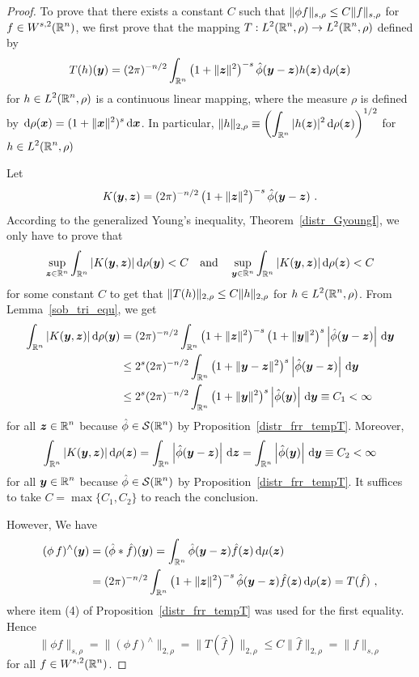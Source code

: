 \begin{proof}
To prove that there exists a constant $C$ such that
$\displaystyle \|\phi f \|_{s,\rho} \leq C \|f\|_{s,\rho}$ for
$\displaystyle f \in W^{s,2}(\mathbb{R}^n)$, we first prove that the mapping 
$\displaystyle T : L^2(\mathbb{R}^n,\rho) \rightarrow L^2(\mathbb{R}^n,\rho)$
defined by
\[
T(h)({\bm{y}}) =
(2\pi)^{-n/2} \int_{\mathbb{R}^n} \left(1+\|{\bm{z}}\|^2\right)^{-s}
\hat{\phi}({\bm{y}} - {\bm{z}}) h({\bm{z}}) \,\mathrm{d}{\rho({\bm{z}})}
\]
for $\displaystyle h \in L^2(\mathbb{R}^n,\rho)$ is a continuous linear
mapping, where the measure $\rho$ is defined by
$\displaystyle \,\mathrm{d}{\rho({\bm{x}})} = (1+\|{\bm{x}}\|^2)^s\,\mathrm{d}{{\bm{x}}}$.
In particular,
$\displaystyle \|h\|_{2,\rho} \equiv \left(
\int_{\mathbb{R}^n} |h({\bm{z}})|^2 \,\mathrm{d}{\rho({\bm{z}})}\right)^{1/2}$ for
$\displaystyle h \in L^2(\mathbb{R}^n,\rho)$

Let
\[
K({\bm{y}},{\bm{z}}) =(2\pi)^{-n/2} \left(1+\|{\bm{z}}\|^2\right)^{-s}
\hat{\phi}({\bm{y}} - {\bm{z}}) \ .
\]
According to the generalized Young's inequality,
Theorem~\ref{distr_GyoungI}, we only have to prove that
\[
\sup_{{\bm{z}}\in\mathbb{R}^n}
\int_{\mathbb{R}^n} |K({\bm{y}},{\bm{z}})|\,\mathrm{d}{\rho({\bm{y}})} < C \quad
\text{and} \quad
\sup_{{\bm{y}}\in\mathbb{R}^n}
\int_{\mathbb{R}^n} |K({\bm{y}},{\bm{z}})|\,\mathrm{d}{\rho({\bm{z}})} < C
\]
for some constant $C$ to get that
$\displaystyle \|T(h) \|_{2,\rho} \leq C \|h\|_{2,\rho}$ for
$\displaystyle h \in L^2(\mathbb{R}^n,\rho)$.  From
Lemma~\ref{sob_tri_equ}, we get
\begin{align*}
\int_{\mathbb{R}^n}|K({\bm{y}},{\bm{z}})| \,\mathrm{d}{\rho({\bm{y}})}
&= (2\pi)^{-n/2} \int_{\mathbb{R}^n} \left(1+\|{\bm{z}}\|^2\right)^{-s}
\left(1+\|{\bm{y}}\|^2\right)^{s}
\left|\hat{\phi}({\bm{y}} - {\bm{z}})\right|\,\mathrm{d}{{\bm{y}}} \\
&\leq 2^s (2\pi)^{-n/2} \int_{\mathbb{R}^n} \left(1+\|{\bm{y}}-{\bm{z}}\|^2\right)^{s}
\left|\hat{\phi}({\bm{y}} - {\bm{z}})\right|\,\mathrm{d}{{\bm{y}}} \\
&\leq 2^s (2\pi)^{-n/2} \int_{\mathbb{R}^n} \left(1+\|{\bm{y}}\|^2\right)^{s}
\left|\hat{\phi}({\bm{y}})\right|\,\mathrm{d}{{\bm{y}}} \equiv C_1 < \infty
\end{align*}
for all $\displaystyle {\bm{z}}\in \mathbb{R}^n$ because
$\displaystyle \hat{\phi} \in \mathcal{S}(\mathbb{R}^n)$ by
Proposition~\ref{distr_frr_tempT}.
Moreover,
\[
\int_{\mathbb{R}^n} |K({\bm{y}}, {\bm{z}})| \,\mathrm{d}{\rho({\bm{z}})}
= \int_{\mathbb{R}^n} \left|\hat{\phi}({\bm{y}} - {\bm{z}})\right|\,\mathrm{d}{{\bm{z}}}
= \int_{\mathbb{R}^n} \left|\hat{\phi}({\bm{y}})\right|\,\mathrm{d}{{\bm{y}}} \equiv C_2
< \infty
\]
for all $\displaystyle {\bm{y}}\in \mathbb{R}^n$ because
$\displaystyle \hat{\phi} \in \mathcal{S}(\mathbb{R}^n)$ by
Proposition~\ref{distr_frr_tempT}.  It suffices to take
$C = \max\{C_1,C_2\}$ to reach the conclusion.

However, We have
\begin{align*}
(\phi\,f)^\wedge({\bm{y}}) &= (\hat{\phi}\ast \hat{f})({\bm{y}})
= \int_{\mathbb{R}^n} \hat{\phi}({\bm{y}} - {\bm{z}}) \hat{f}({\bm{z}})
\,\mathrm{d}{\mu({\bm{z}})} \\
&= (2\pi)^{-n/2} \int_{\mathbb{R}^n} \left(1+\|{\bm{z}}\|^2\right)^{-s}
\hat{\phi}({\bm{y}} - {\bm{z}}) \hat{f}({\bm{z}}) \,\mathrm{d}{\rho({\bm{z}})}
= T(\hat{f}) \ ,
\end{align*}
where item (4) of Proposition~\ref{distr_frr_tempT} was used for the
first equality.  Hence
\[
\|\phi f\|_{s,\rho} = \| (\phi\, f)^\wedge\|_{2,\rho}
= \| T(\hat{f}) \|_{2,\rho} \leq C \|\hat{f}\|_{2,\rho}
= \|f \|_{s,\rho}
\]
for all $\displaystyle f \in W^{s,2}(\mathbb{R}^n)$.
\end{proof}

